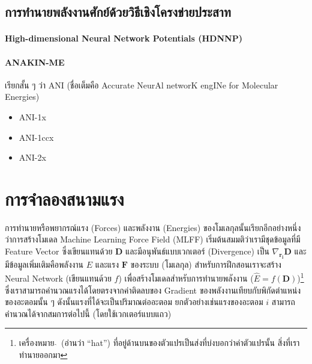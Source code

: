 \subsection{การทำนายพลังงานศักย์ด้วยวิธีเชิงโครงข่ายประสาท}
\label{ssec:pred_pot_ener_nn}

\paragraph{High-dimensional Neural Network Potentials (HDNNP)}
\autocite{behler2007}

\paragraph{ANAKIN-ME} เรียกสั้น ๆ ว่า ANI (ชื่อเต็มคือ Accurate NeurAl networK engINe for Molecular Energies)

\begin{itemize}
    \item ANI-1x\autocite{smith2017}
    \item ANI-1ccx\autocite{smith2018}
    \item ANI-2x\autocite{smith2019,devereux2020}
\end{itemize}

\section{การจำลองสนามแรง}
\label{sec:model_ff}

การทำนายหรือพยากรณ์แรง (Forces) และพลังงาน (Energies) ของโมเลกุลนั้นเรียกอีกอย่างหนึ่งว่าการสร้างโมเดล Machine Learning 
Force Field (MLFF) เริ่มต้นสมมติว่าเรามีชุดข้อมูลที่มี Feature Vector ซึ่งเขียนแทนด้วย $\mathbf{D}$ และมีอนุพันธ์แบบเวกเตอร์ 
(Divergence) เป็น $\nabla_{\mathbf{r_i}} \mathbf{D}$ และมีข้อมูลเพิ่มเติมคือพลังงาน $E$ และแรง $\mathbf{F}$ ของระบบ 
(โมเลกุล) สำหรับการฝึกสอนเราจะสร้าง Neural Network (เขียนแทนด้วย $f$) เพื่อสร้างโมเดลสำหรับการทำนายพลังงาน ($\hat{E} = 
f(\mathbf{D})$)\footnote{เครื่องหมาย $\hat{}$\, (อ่านว่า \enquote{hat}) ที่อยู่ด้านบนของตัวแปรเป็นส่งที่บ่งบอกว่าค่าตัวแปรนั้น%
สิ่งที่เราทำนายออกมา} ซึ่งเราสามารถคำนวณแรงได้โดยตรงจากค่าติดลบของ Gradient ของพลังงานเทียบกับพิกัดตำแหน่งของอะตอมนั้น ๆ 
ดังนั้นแรงที่ได้จะเป็นปริมาณต่ออะตอม ยกตัวอย่างเช่นแรงของอะตอม $i$ สามารถคำนวณได้จากสมการต่อไปนี้ (โดยใช้เวกเตอร์แบบแถว)

